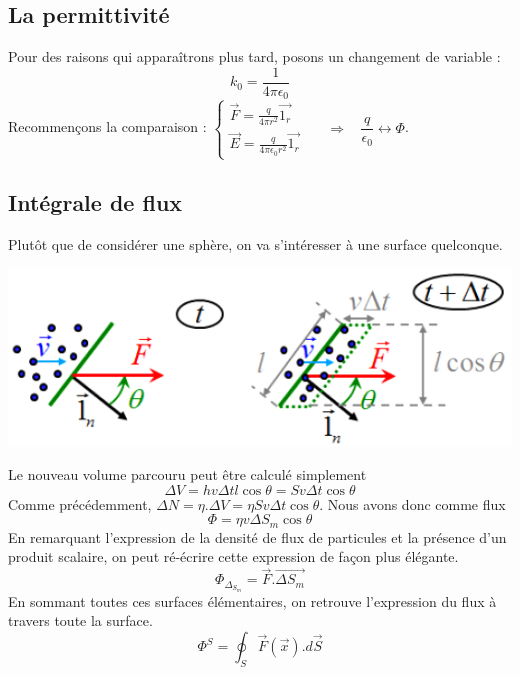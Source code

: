 \documentclass	[11pt, a4paper, openany]{book}
\begin{document}
\subsection{La permittivité}
Pour des raisons qui apparaîtrons plus tard, posons un changement de variable :
\begin{equation}
	k_0 = \frac{1}{4\pi \epsilon_0}
\end{equation}
Recommençons la comparaison : $\left\{\begin{array}{l}
\vec{F} = \frac{q}{4\pi r^2}\vec{1_r}\\
\vec{E} = \frac{q}{4\pi \epsilon_0 r^2}\vec{1_r}
\end{array}\right.$\ \ \ $\Rightarrow\ \ \ \ \dfrac{q}{\epsilon_0} \leftrightarrow \Phi$.

\subsection{Intégrale de flux}
Plutôt que de considérer une sphère, on va s'intéresser à une surface quelconque.
\begin{center}
	\includegraphics[scale=0.5]{es/image7.png}
\end{center}
Le nouveau volume parcouru peut être calculé simplement
\begin{equation}
	\Delta V = hv\Delta t l \cos\theta = S v \Delta t \cos\theta
\end{equation}
Comme précédemment, $\Delta N = \eta . \Delta V = \eta S v \Delta t \cos\theta$. Nous avons donc comme flux
\begin{equation}
	\Phi = \eta v \Delta S_m \cos\theta
\end{equation}
En remarquant l'expression de la densité de flux de particules et la présence d'un produit scalaire, on peut ré-écrire cette expression de façon plus élégante.
\begin{equation}
	\Phi_{\Delta_{S_m}} = \vec{F}.\vec{\Delta S_m}
\end{equation}
En sommant toutes ces surfaces élémentaires, on retrouve l'expression du flux à travers toute la surface.
\begin{equation}
	\Phi^S = \oint_S \vec{F}(\vec x).d\vec{S}
\end{equation}
\end{document}
